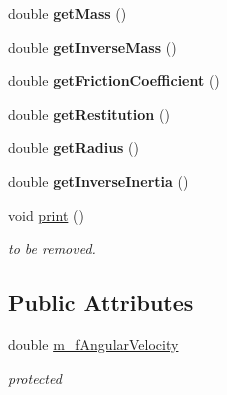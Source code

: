 \begin{DoxyCompactItemize}
\item 
\hypertarget{class_collidable_a345fc798e6a77b293c1db72861f0e0e7}{}double {\bfseries get\+Mass} ()\label{class_collidable_a345fc798e6a77b293c1db72861f0e0e7}

\item 
\hypertarget{class_collidable_a3ceb05fc466651c75f1c23231a9cf7a9}{}double {\bfseries get\+Inverse\+Mass} ()\label{class_collidable_a3ceb05fc466651c75f1c23231a9cf7a9}

\item 
\hypertarget{class_collidable_abba60551401e8054396b6c2408af7a8d}{}double {\bfseries get\+Friction\+Coefficient} ()\label{class_collidable_abba60551401e8054396b6c2408af7a8d}

\item 
\hypertarget{class_collidable_acf2920747b5a970b7f8280b1d04cdc94}{}double {\bfseries get\+Restitution} ()\label{class_collidable_acf2920747b5a970b7f8280b1d04cdc94}

\item 
\hypertarget{class_collidable_a265fb4ef01dc1997494374205181a6bb}{}double {\bfseries get\+Radius} ()\label{class_collidable_a265fb4ef01dc1997494374205181a6bb}

\item 
\hypertarget{class_collidable_a4368969a86c2e6fe908bfdd7ae8f7908}{}double {\bfseries get\+Inverse\+Inertia} ()\label{class_collidable_a4368969a86c2e6fe908bfdd7ae8f7908}

\item 
\hypertarget{class_collidable_ac4597915c92e32ea10220808da31c750}{}void \hyperlink{class_collidable_ac4597915c92e32ea10220808da31c750}{print} ()\label{class_collidable_ac4597915c92e32ea10220808da31c750}

\begin{DoxyCompactList}\small\item\em to be removed. \end{DoxyCompactList}\end{DoxyCompactItemize}
\subsection*{Public Attributes}
\begin{DoxyCompactItemize}
\item 
\hypertarget{class_collidable_a5a6501f0c062b6c24f3121c5c68b59d4}{}double \hyperlink{class_collidable_a5a6501f0c062b6c24f3121c5c68b59d4}{m\+\_\+f\+Angular\+Velocity}\label{class_collidable_a5a6501f0c062b6c24f3121c5c68b59d4}

\begin{DoxyCompactList}\small\item\em protected \end{DoxyCompactList}\end{DoxyCompactItemize}
